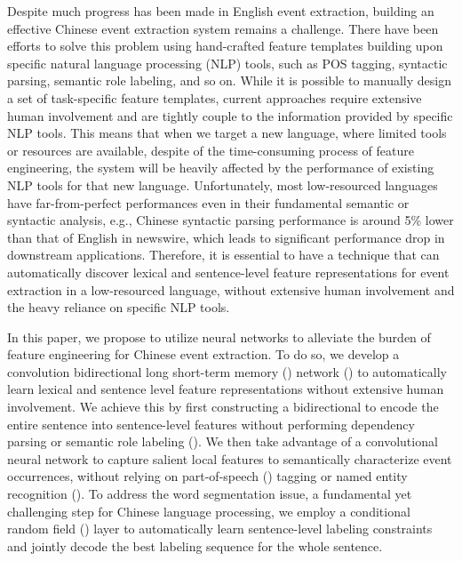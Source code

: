 Despite much progress has been made in English event extraction, building an effective Chinese event extraction system
remains a challenge. There have been efforts to solve this problem using hand-crafted feature templates
building upon specific natural language processing (NLP) tools, such as POS tagging, syntactic parsing, semantic role labeling, and so on. 
While it is possible to manually design a set of task-specific feature templates, current approaches require extensive human involvement 
and are tightly couple to the information provided by specific NLP tools. This means that when we target a new  language,  where limited tools or resources are available, 
despite of the time-consuming process of feature engineering, the system will be heavily affected by the performance of existing NLP tools
for that new language. Unfortunately, most low-resourced languages have far-from-perfect performances even in their fundamental semantic or 
syntactic analysis, e.g., Chinese syntactic parsing performance is around 5\% lower than that of English in newswire, which leads to significant 
performance drop in downstream applications.   
Therefore, it is essential to have a technique that can automatically discover lexical and sentence-level
feature representations for event extraction in a low-resourced language, without extensive human involvement and the heavy reliance on specific NLP tools. 

In this paper, we propose to utilize neural networks to alleviate the burden of feature
engineering for Chinese event extraction. To do so, we develop a convolution bidirectional long short-term memory
(\LSTM) network (\CBiLSTM) to automatically learn lexical and sentence level feature representations without extensive human
involvement. We achieve this by first constructing a bidirectional \LSTM to encode the entire sentence into
sentence-level features without performing dependency parsing or semantic role labeling (\SRL). %
We then take advantage of a convolutional neural network to capture salient local features
to semantically characterize event occurrences, %
without relying on part-of-speech (\POS) tagging or named entity
recognition (\NER). %
To address the word segmentation issue, a fundamental yet challenging step for Chinese language processing, we employ
a conditional random field (\CRF) layer to automatically learn sentence-level labeling constraints and jointly decode
the best labeling sequence for the whole sentence.

